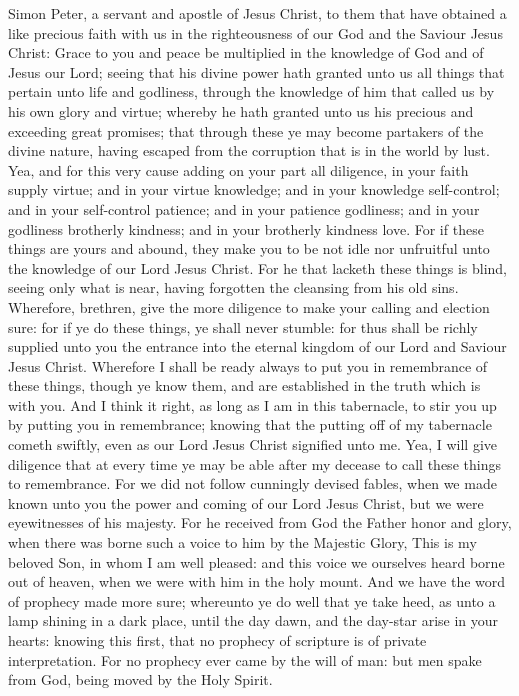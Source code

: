 


Simon Peter, a servant and apostle of Jesus Christ, to them that have obtained a like precious faith with us in the righteousness of our God and the Saviour Jesus Christ: Grace to you and peace be multiplied in the knowledge of God and of Jesus our Lord; seeing that his divine power hath granted unto us all things that pertain unto life and godliness, through the knowledge of him that called us by his own glory and virtue; whereby he hath granted unto us his precious and exceeding great promises; that through these ye may become partakers of the divine nature, having escaped from the corruption that is in the world by lust. Yea, and for this very cause adding on your part all diligence, in your faith supply virtue; and in your virtue knowledge; and in your knowledge self-control; and in your self-control patience; and in your patience godliness; and in your godliness brotherly kindness; and in your brotherly kindness love. For if these things are yours and abound, they make you to be not idle nor unfruitful unto the knowledge of our Lord Jesus Christ. For he that lacketh these things is blind, seeing only what is near, having forgotten the cleansing from his old sins. Wherefore, brethren, give the more diligence to make your calling and election sure: for if ye do these things, ye shall never stumble: for thus shall be richly supplied unto you the entrance into the eternal kingdom of our Lord and Saviour Jesus Christ.  Wherefore I shall be ready always to put you in remembrance of these things, though ye know them, and are established in the truth which is with you. And I think it right, as long as I am in this tabernacle, to stir you up by putting you in remembrance; knowing that the putting off of my tabernacle cometh swiftly, even as our Lord Jesus Christ signified unto me. Yea, I will give diligence that at every time ye may be able after my decease to call these things to remembrance. For we did not follow cunningly devised fables, when we made known unto you the power and coming of our Lord Jesus Christ, but we were eyewitnesses of his majesty. For he received from God the Father honor and glory, when there was borne such a voice to him by the Majestic Glory, This is my beloved Son, in whom I am well pleased: and this voice we ourselves heard borne out of heaven, when we were with him in the holy mount. And we have the word of prophecy made more sure; whereunto ye do well that ye take heed, as unto a lamp shining in a dark place, until the day dawn, and the day-star arise in your hearts: knowing this first, that no prophecy of scripture is of private interpretation. For no prophecy ever came by the will of man: but men spake from God, being moved by the Holy Spirit. 

